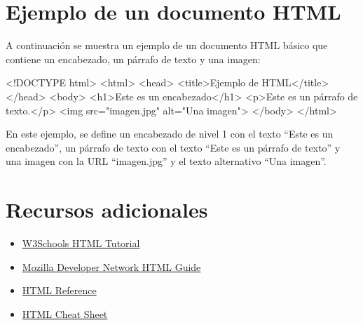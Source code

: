 \documentclass[
  a4paper,
  DIV=11,
  numbers=noendperiod,
  onepage,
  openany]{scrreprt}
\newenvironment{Shaded}{\begin{snugshade}}{\end{snugshade}}
\newcommand{\DataTypeTok}[1]{\textcolor[rgb]{0.68,0.00,0.00}{#1}}
\newcommand{\KeywordTok}[1]{\textcolor[rgb]{0.00,0.23,0.31}{#1}}
\newcommand{\NormalTok}[1]{\textcolor[rgb]{0.00,0.23,0.31}{#1}}
\newcommand{\OperatorTok}[1]{\textcolor[rgb]{0.37,0.37,0.37}{#1}}
\newcommand{\OtherTok}[1]{\textcolor[rgb]{0.00,0.23,0.31}{#1}}
\newcommand{\StringTok}[1]{\textcolor[rgb]{0.13,0.47,0.30}{#1}}
\providecommand{\tightlist}{%
  \setlength{\itemsep}{0pt}\setlength{\parskip}{0pt}}\usepackage{longtable,booktabs,array}
\begin{document}
\section{Ejemplo de un documento
HTML}\label{ejemplo-de-un-documento-html}

A continuación se muestra un ejemplo de un documento HTML básico que
contiene un encabezado, un párrafo de texto y una imagen:

\begin{Shaded}
\begin{Highlighting}[]
\DataTypeTok{\textless{}!DOCTYPE }\NormalTok{html}\DataTypeTok{\textgreater{}}
\DataTypeTok{\textless{}}\KeywordTok{html}\DataTypeTok{\textgreater{}}
    \DataTypeTok{\textless{}}\KeywordTok{head}\DataTypeTok{\textgreater{}}
        \DataTypeTok{\textless{}}\KeywordTok{title}\DataTypeTok{\textgreater{}}\NormalTok{Ejemplo de HTML}\DataTypeTok{\textless{}/}\KeywordTok{title}\DataTypeTok{\textgreater{}}
    \DataTypeTok{\textless{}/}\KeywordTok{head}\DataTypeTok{\textgreater{}}
    \DataTypeTok{\textless{}}\KeywordTok{body}\DataTypeTok{\textgreater{}}
        \DataTypeTok{\textless{}}\KeywordTok{h1}\DataTypeTok{\textgreater{}}\NormalTok{Este es un encabezado}\DataTypeTok{\textless{}/}\KeywordTok{h1}\DataTypeTok{\textgreater{}}
        \DataTypeTok{\textless{}}\KeywordTok{p}\DataTypeTok{\textgreater{}}\NormalTok{Este es un párrafo de texto.}\DataTypeTok{\textless{}/}\KeywordTok{p}\DataTypeTok{\textgreater{}}
        \DataTypeTok{\textless{}}\KeywordTok{img}\OtherTok{ src}\OperatorTok{=}\StringTok{"imagen.jpg"}\OtherTok{ alt}\OperatorTok{=}\StringTok{"Una imagen"}\DataTypeTok{\textgreater{}}
    \DataTypeTok{\textless{}/}\KeywordTok{body}\DataTypeTok{\textgreater{}}
\DataTypeTok{\textless{}/}\KeywordTok{html}\DataTypeTok{\textgreater{}}
\end{Highlighting}
\end{Shaded}

En este ejemplo, se define un encabezado de nivel 1 con el texto ``Este
es un encabezado'', un párrafo de texto con el texto ``Este es un
párrafo de texto'' y una imagen con la URL ``imagen.jpg'' y el texto
alternativo ``Una imagen''.

\section{Recursos adicionales}\label{recursos-adicionales}

\begin{itemize}
\tightlist
\item
  \href{https://www.w3schools.com/html/}{W3Schools HTML Tutorial}
\item
  \href{https://developer.mozilla.org/en-US/docs/Web/HTML}{Mozilla
  Developer Network HTML Guide}
\item
  \href{https://htmlreference.io/}{HTML Reference}
\item
  \href{https://htmlcheatsheet.com/}{HTML Cheat Sheet}
\end{itemize}
\end{document}
